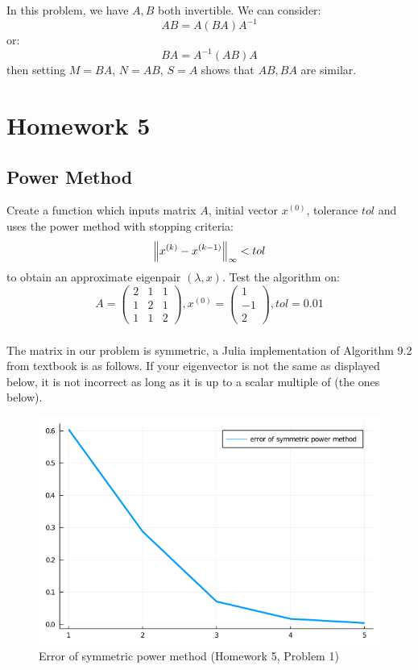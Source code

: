 \documentclass[12pt]{article} %
\newcommand{\1}[1]{\mathds{1}\left[#1\right]}
\begin{document}
In this problem, we have $A, B$ both invertible. We can consider:
$$
	AB = A(BA)A^{-1}
$$ or:
$$
	BA = A^{-1}(AB)A
$$ then setting $M = BA$, $N = AB$, $S = A$ shows that $AB, BA$ are similar.
\newpage

\section{Homework 5}
\subsection{Power Method}
Create a function which inputs matrix $A$, initial vector $x^{(0)}$, tolerance $tol$ and uses the power method with stopping criteria:
$$
	\norm{x^{(k)} - x^{(k-1)}}_{\infty} < tol	
$$ to obtain an approximate eigenpair $(\lambda, x)$. Test the algorithm on:
$$
	A = 
	\begin{pmatrix}
		2 & 1 & 1 \\
		1 & 2 & 1 \\
		1 & 1 & 2
	\end{pmatrix}, 
		x^{(0)} = 
		\begin{pmatrix}
		1\\
		-1\\
		2
		\end{pmatrix}, tol = 0.01
$$
\subsubsection{}
The matrix in our problem is symmetric, a Julia implementation of Algorithm 9.2 from textbook is as follows. If your eigenvector is not the same as displayed below, it is not incorrect as long as it is up to a scalar multiple of (the ones below).

\begin{figure}[t]
\includegraphics[width=12cm]{download.png}
\caption{Error of symmetric power method (Homework 5, Problem 1)}
\centering
\end{figure}
\end{document}
